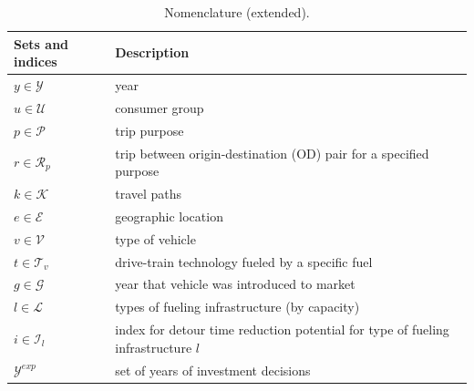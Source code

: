 \documentclass[preprint,review,11pt, authoryear]{elsarticle}
\begin{document}
\begin{scriptsize}
\begin{longtable}{llll}
\caption{Nomenclature (extended).}
\label{tab:nomenclature_main}\\
\hline
Sets and indices                         & Description                                                          &         &               \\ \hline
\endfirsthead
%
\endhead
%
\hline
\endfoot
%
\endlastfoot
%
$y \in \mathcal{Y}$                      & year                                                                 &         &               \\
$u \in \mathcal{U}$                      & consumer group                                                       &         &               \\
$p \in \mathcal{P}$                      & trip purpose                                                         &         &               \\
$r \in \mathcal{R}_p$                    & trip between origin-destination (OD) pair for a specified purpose    &         &               \\
$k \in \mathcal{K}$                      & travel paths                                                         &         &               \\
$e \in \mathcal{E}$                      & geographic location                                                  &         &               \\
$v \in \mathcal{V}$                      & type of vehicle                                                      &         &               \\
$t \in \mathcal{T}_v$                    & drive-train technology fueled by a specific fuel                     &         &               \\
$g \in \mathcal{G}$                      & year that vehicle was introduced to market                           &         &               \\
$l \in \mathcal{L}$                      & types of fueling infrastructure (by capacity)                        &         &               \\
$i \in \mathcal{I}_l$ &  \multicolumn{3}{l}{index for detour time reduction potential for type of fueling infrastructure $l$ }\\
$\mathcal{Y}^{exp}$                      & set of years of investment decisions                                 &         &               \\

\end{longtable}
\end{scriptsize}
\end{document}
